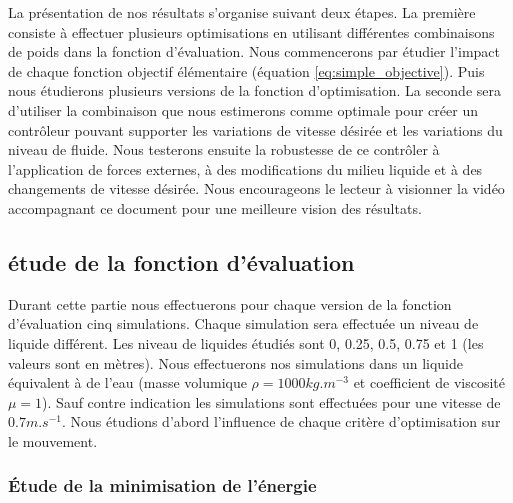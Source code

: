 \documentclass[runningheads,a4paper]{llncs}
\begin{document}
La présentation de nos résultats s'organise suivant deux étapes. La première consiste à effectuer plusieurs optimisations en utilisant différentes combinaisons de poids dans la fonction d'évaluation. Nous commencerons par étudier l'impact de chaque fonction objectif élémentaire (équation \ref{eq:simple_objective}). Puis nous étudierons plusieurs versions de la fonction d'optimisation. La seconde sera d'utiliser la combinaison que nous estimerons comme optimale pour créer un contrôleur pouvant supporter les variations de vitesse désirée et les variations du niveau de fluide. Nous testerons ensuite la robustesse de ce contrôler à l'application de forces externes, à des modifications du milieu liquide et à des changements de vitesse désirée. Nous encourageons le lecteur à visionner la vidéo accompagnant ce document pour une meilleure vision des résultats.

\subsection{étude de la fonction d'évaluation}

Durant cette partie nous effectuerons pour chaque version de la fonction d'évaluation cinq simulations. Chaque simulation sera effectuée un niveau de liquide différent. Les niveau de liquides étudiés sont 0, 0.25, 0.5, 0.75 et 1 (les valeurs sont en mètres). Nous effectuerons nos simulations dans un liquide équivalent à de l'eau (masse volumique $\rho =1000kg.m^{-3}$ et coefficient de viscosité  $\mu =1$). Sauf contre indication les simulations sont effectuées pour une vitesse de $0.7m.s^{-1}$. Nous étudions d'abord l'influence de chaque critère d'optimisation sur le mouvement.

\subsubsection{Étude de la minimisation de l'énergie}
\end{document}
